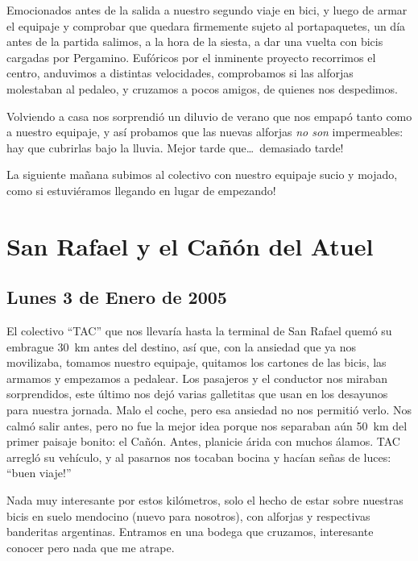 
Emocionados antes de la salida a nuestro segundo viaje en bici, y luego de armar
el equipaje y comprobar que quedara firmemente sujeto al portapaquetes, un d\'ia
antes de la partida salimos, a la hora de la siesta, a dar una vuelta con bicis
cargadas por Pergamino. Euf\'oricos por el inminente proyecto recorrimos el
centro, anduvimos a distintas velocidades, comprobamos si las alforjas
molestaban al pedaleo, y cruzamos a pocos amigos, de quienes nos despedimos.

Volviendo a casa nos sorprendi\'o un diluvio de verano que nos empap\'o tanto
como a nuestro equipaje, y as\'i probamos que las nuevas alforjas \emph{no son}
impermeables: hay que cubrirlas bajo la lluvia. Mejor tarde que\ldots\
\textexclamdown demasiado tarde!

La siguiente ma\~nana subimos al colectivo con nuestro equipaje sucio y mojado,
\textexclamdown como si estuvi\'eramos llegando en lugar de empezando!

\section{San Rafael y el Ca\~n\'on del Atuel}

\subsection*{Lunes 3 de Enero de 2005}

El colectivo ``{\small TAC}'' que nos llevar\'ia hasta la terminal de San Rafael
quem\'o su embrague 30~km antes del destino, as\'i que, con la ansiedad que ya
nos movilizaba, tomamos nuestro equipaje, quitamos los cartones de las bicis,
las armamos y empezamos a pedalear. Los pasajeros y el conductor nos miraban
sorprendidos, este \'ultimo nos dej\'o varias galletitas que usan en los
desayunos para nuestra jornada. Malo el coche, pero esa ansiedad no nos
permiti\'o verlo. Nos calm\'o salir antes, pero no fue la mejor idea porque nos
separaban a\'un 50~km del primer paisaje bonito: el Ca\~n\'on. Antes, planicie
\'arida con muchos \'alamos. {\small TAC} arregl\'o su veh\'iculo, y al pasarnos
nos tocaban bocina y hac\'ian se\~nas de luces: ``\textexclamdown buen viaje!''

Nada muy interesante por estos kil\'ometros, solo el hecho de estar sobre
nuestras bicis en suelo mendocino (nuevo para nosotros), con alforjas y
respectivas banderitas argentinas. Entramos en una bodega que cruzamos,
interesante conocer pero nada que me atrape.

